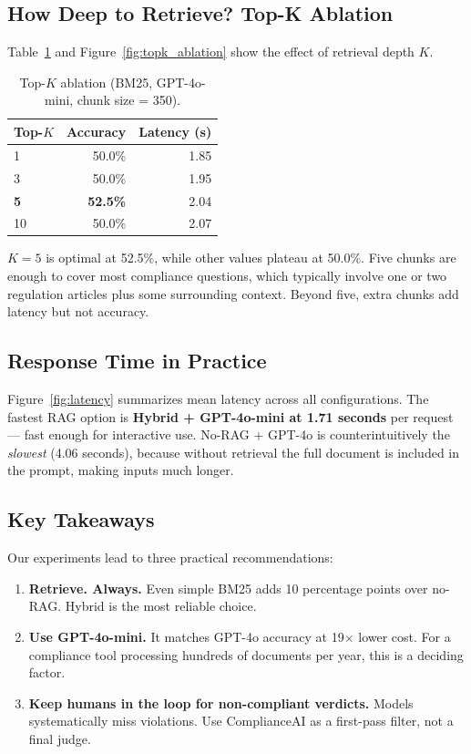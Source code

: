 \subsection{How Deep to Retrieve? Top-K Ablation}

Table~\ref{tab:topk_ablation} and Figure~\ref{fig:topk_ablation} show
the effect of retrieval depth $K$.

\begin{table}[H]
\centering
\footnotesize
\caption{Top-$K$ ablation (BM25, GPT-4o-mini, chunk size = 350).}
\label{tab:topk_ablation}
\begin{tabular}{lrr}
\toprule
Top-$K$ & Accuracy & Latency (s) \\
\midrule
1       & 50.0\%   & 1.85 \\
3       & 50.0\%   & 1.95 \\
\textbf{5}  & \textbf{52.5\%} & 2.04 \\
10      & 50.0\%   & 2.07 \\
\bottomrule
\end{tabular}
\end{table}

$K{=}5$ is optimal at 52.5\%, while other values plateau at 50.0\%.
Five chunks are enough to cover most compliance questions, which typically
involve one or two regulation articles plus some surrounding context.
Beyond five, extra chunks add latency but not accuracy.

\subsection{Response Time in Practice}

Figure~\ref{fig:latency} summarizes mean latency across all configurations.
The fastest RAG option is \textbf{Hybrid + GPT-4o-mini at 1.71 seconds}
per request --- fast enough for interactive use.
No-RAG + GPT-4o is counterintuitively the \textit{slowest} (4.06 seconds),
because without retrieval the full document is included in the prompt,
making inputs much longer.

\subsection{Key Takeaways}

Our experiments lead to three practical recommendations:

\begin{enumerate}
  \item \textbf{Retrieve. Always.}
    Even simple BM25 adds 10 percentage points over no-RAG.
    Hybrid is the most reliable choice.

  \item \textbf{Use GPT-4o-mini.}
    It matches GPT-4o accuracy at 19$\times$ lower cost.
    For a compliance tool processing hundreds of documents per year,
    this is a deciding factor.

  \item \textbf{Keep humans in the loop for non-compliant verdicts.}
    Models systematically miss violations. Use ComplianceAI as a
    first-pass filter, not a final judge.
\end{enumerate}
